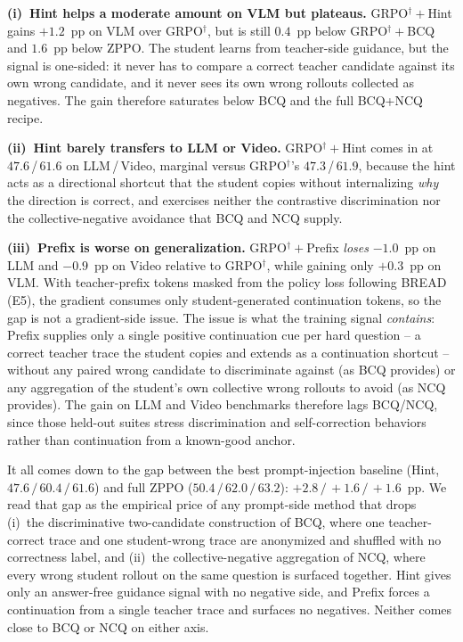 \textbf{(i)~Hint helps a moderate amount on VLM but plateaus.} GRPO$^{\dagger}\!+\!$Hint gains $+1.2$~pp on VLM over GRPO$^{\dagger}$, but is still $0.4$~pp below GRPO$^{\dagger}\!+\!$BCQ and $1.6$~pp below ZPPO. The student learns from teacher-side guidance, but the signal is one-sided: it never has to compare a correct teacher candidate against its own wrong candidate, and it never sees its own wrong rollouts collected as negatives. The gain therefore saturates below BCQ and the full BCQ+NCQ recipe.

\textbf{(ii)~Hint barely transfers to LLM or Video.} GRPO$^{\dagger}\!+\!$Hint comes in at $47.6$\,/\,$61.6$ on LLM\,/\,Video, marginal versus GRPO$^{\dagger}$'s $47.3$\,/\,$61.9$, because the hint acts as a directional shortcut that the student copies without internalizing \emph{why} the direction is correct, and exercises neither the contrastive discrimination nor the collective-negative avoidance that BCQ and NCQ supply.

\textbf{(iii)~Prefix is worse on generalization.} GRPO$^{\dagger}\!+\!$Prefix \emph{loses} $-1.0$~pp on LLM and $-0.9$~pp on Video relative to GRPO$^{\dagger}$, while gaining only $+0.3$~pp on VLM. With teacher-prefix tokens masked from the policy loss following BREAD (E5), the gradient consumes only student-generated continuation tokens, so the gap is not a gradient-side issue. The issue is what the training signal \emph{contains}: Prefix supplies only a single positive continuation cue per hard question -- a correct teacher trace the student copies and extends as a continuation shortcut -- without any paired wrong candidate to discriminate against (as BCQ provides) or any aggregation of the student's own collective wrong rollouts to avoid (as NCQ provides). The gain on LLM and Video benchmarks therefore lags BCQ/NCQ, since those held-out suites stress discrimination and self-correction behaviors rather than continuation from a known-good anchor.

It all comes down to the gap between the best prompt-injection baseline (Hint, $47.6\,/\,60.4\,/\,61.6$) and full ZPPO ($50.4\,/\,62.0\,/\,63.2$): $+2.8\,/\,+1.6\,/\,+1.6$~pp. We read that gap as the empirical price of any prompt-side method that drops (i)~the discriminative two-candidate construction of BCQ, where one teacher-correct trace and one student-wrong trace are anonymized and shuffled with no correctness label, and (ii)~the collective-negative aggregation of NCQ, where every wrong student rollout on the same question is surfaced together. Hint gives only an answer-free guidance signal with no negative side, and Prefix forces a continuation from a single teacher trace and surfaces no negatives. Neither comes close to BCQ or NCQ on either axis.

